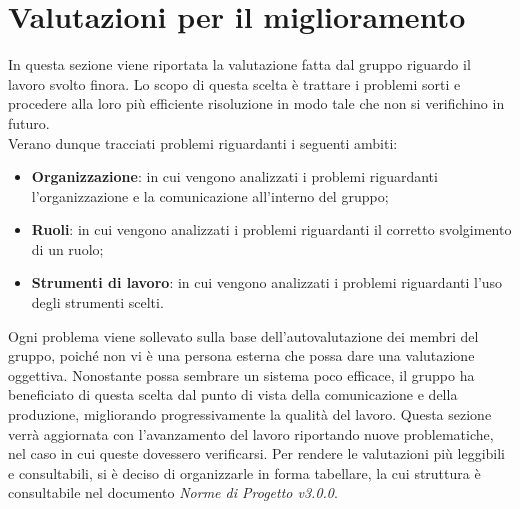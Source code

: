 \section{Valutazioni per il miglioramento}
In questa sezione viene riportata la valutazione fatta dal gruppo riguardo il 
lavoro svolto finora. Lo scopo di questa scelta è trattare i problemi sorti e
procedere alla loro più efficiente risoluzione in modo tale che non si verifichino
in futuro. \\
Verano dunque tracciati problemi riguardanti i seguenti ambiti:

\begin{itemize}
	\item \textbf{Organizzazione}: in cui vengono analizzati i problemi riguardanti 
		l'organizzazione e la comunicazione all'interno del gruppo;
	\item \textbf{Ruoli}: in cui vengono analizzati i problemi riguardanti il 
		corretto svolgimento di un ruolo;
	\item \textbf{Strumenti di lavoro}: in cui vengono analizzati i problemi riguardanti 
		l'uso degli strumenti scelti.
\end{itemize}

\noindent Ogni problema viene sollevato sulla base dell'autovalutazione dei membri del 
gruppo, poiché non vi è una persona esterna che possa dare una valutazione
oggettiva. Nonostante possa sembrare un sistema poco efficace, il gruppo ha 
beneficiato di questa scelta dal punto di vista della comunicazione e della produzione, migliorando progressivamente la qualità del lavoro.
Questa sezione verrà aggiornata con l'avanzamento del lavoro riportando nuove 
problematiche, nel caso in cui queste dovessero verificarsi.
Per rendere le valutazioni più leggibili e consultabili, si è
deciso di organizzarle in forma tabellare, la cui struttura è 
consultabile nel documento \textit{Norme di Progetto v3.0.0}.

